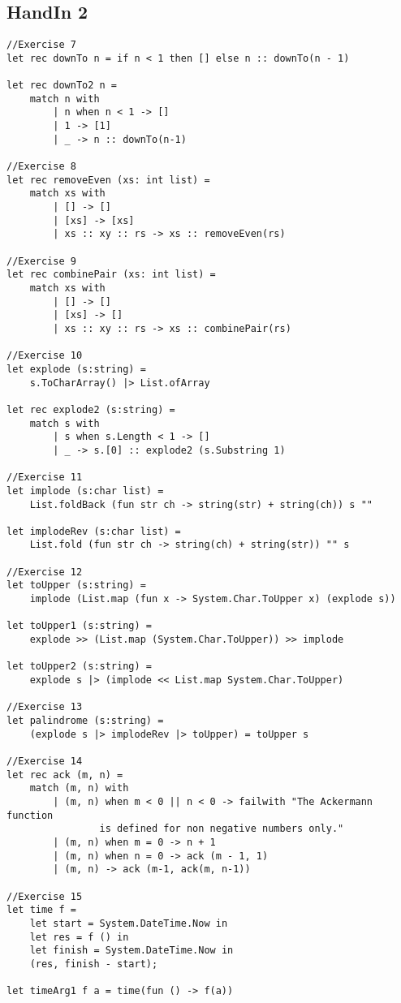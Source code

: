 \subsection{HandIn 2}
\label{Appendix_FSharp_Grooss_2}
\begin{lstlisting}
//Exercise 7
let rec downTo n = if n < 1 then [] else n :: downTo(n - 1)

let rec downTo2 n = 
    match n with
		| n when n < 1 -> []
        | 1 -> [1]
        | _ -> n :: downTo(n-1)

//Exercise 8
let rec removeEven (xs: int list) =
    match xs with
        | [] -> []
        | [xs] -> [xs]
        | xs :: xy :: rs -> xs :: removeEven(rs)

//Exercise 9
let rec combinePair (xs: int list) =
    match xs with
        | [] -> []
        | [xs] -> []
        | xs :: xy :: rs -> xs :: combinePair(rs)

//Exercise 10
let explode (s:string) =
    s.ToCharArray() |> List.ofArray

let rec explode2 (s:string) =
    match s with
        | s when s.Length < 1 -> []
        | _ -> s.[0] :: explode2 (s.Substring 1)

//Exercise 11
let implode (s:char list) =
    List.foldBack (fun str ch -> string(str) + string(ch)) s ""
    
let implodeRev (s:char list) =
    List.fold (fun str ch -> string(ch) + string(str)) "" s

//Exercise 12
let toUpper (s:string) =
    implode (List.map (fun x -> System.Char.ToUpper x) (explode s))

let toUpper1 (s:string) =
    explode >> (List.map (System.Char.ToUpper)) >> implode

let toUpper2 (s:string) =
    explode s |> (implode << List.map System.Char.ToUpper)

//Exercise 13
let palindrome (s:string) =
    (explode s |> implodeRev |> toUpper) = toUpper s

//Exercise 14
let rec ack (m, n) =
    match (m, n) with
        | (m, n) when m < 0 || n < 0 -> failwith "The Ackermann function 
				is defined for non negative numbers only."
        | (m, n) when m = 0 -> n + 1
        | (m, n) when n = 0 -> ack (m - 1, 1)
        | (m, n) -> ack (m-1, ack(m, n-1))

//Exercise 15
let time f =
    let start = System.DateTime.Now in
    let res = f () in
    let finish = System.DateTime.Now in
    (res, finish - start);

let timeArg1 f a = time(fun () -> f(a))
\end{lstlisting}
